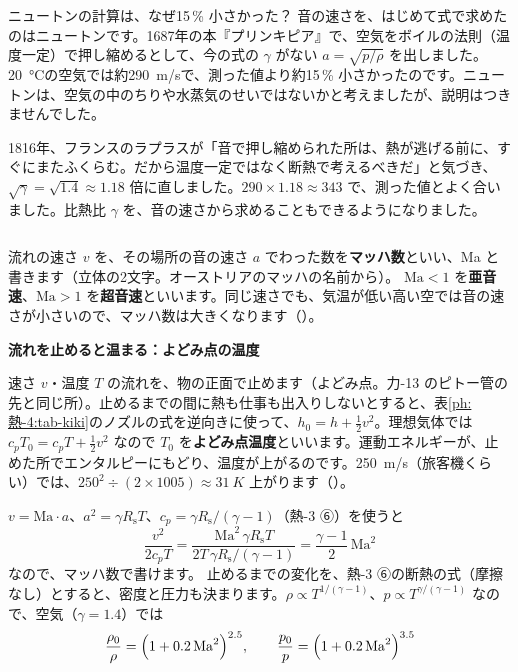 \begin{column}{ニュートンの計算は、なぜ15\,\% 小さかった？}
音の速さを、はじめて式で求めたのはニュートンです。1687年の本『プリンキピア』で、空気をボイルの法則（温度一定）で押し縮めるとして、今の式の $\gamma$ がない $a=\sqrt{p/\rho}$ を出しました。\qty{20}{\celsius}の空気では約\qty{290}{m/s}で、測った値より約15\,\% 小さかったのです。ニュートンは、空気の中のちりや水蒸気のせいではないかと考えましたが、説明はつきませんでした。

1816年、フランスのラプラスが「音で押し縮められた所は、熱が逃げる前に、すぐにまたふくらむ。だから温度一定ではなく断熱で考えるべきだ」と気づき、$\sqrt{\gamma}=\sqrt{1.4}\approx1.18$ 倍に直しました。$290\times1.18\approx343$ で、測った値とよく合いました。比熱比 $\gamma$ を、音の速さから求めることもできるようになりました。
\end{column}


\leavevmode\label{ph:熱-4:sec7}流れの速さ $v$ を、その場所の音の速さ $a$ でわった数を\textbf{マッハ数}といい、Ma と書きます（立体の2文字。オーストリアのマッハの名前から）。
$\mathrm{Ma}<1$ を\textbf{亜音速}、$\mathrm{Ma}>1$ を\textbf{超音速}といいます。同じ速さでも、気温が低い高い空では音の速さが小さいので、マッハ数は大きくなります（）。

\noindent\textbf{流れを止めると温まる：よどみ点の温度}\par\nobreak
速さ $v$・温度 $T$ の流れを、物の正面で止めます（よどみ点。力-13 のピトー管の先と同じ所）。止めるまでの間に熱も仕事も出入りしないとすると、表\ref{ph:熱-4:tab-kiki}のノズルの式を逆向きに使って、$h_0=h+\tfrac12v^2$。理想気体では $c_pT_0=c_pT+\tfrac12v^2$ なので
\label{ph:熱-4:yodomi}$T_0$ を\textbf{よどみ点温度}といいます。運動エネルギーが、止めた所でエンタルピーにもどり、温度が上がるのです。\qty{250}{m/s}（旅客機くらい）では、$250^2\div(2\times1005)\approx\qty{31}{K}$ 上がります（）。

$v=\mathrm{Ma}\cdot a$、$a^2=\gamma R_{\mathrm s}T$、$c_p=\gamma R_{\mathrm s}/(\gamma-1)$（熱-3 ⑥）を使うと
\[ \frac{v^2}{2c_pT}=\frac{\mathrm{Ma}^2\,\gamma R_{\mathrm s}T}{2T\,\gamma R_{\mathrm s}/(\gamma-1)}=\frac{\gamma-1}{2}\,\mathrm{Ma}^2 \]
なので、マッハ数で書けます。
止めるまでの変化を、熱-3 ⑥の断熱の式（摩擦なし）とすると、密度と圧力も決まります。$\rho\propto T^{1/(\gamma-1)}$、$p\propto T^{\gamma/(\gamma-1)}$ なので、空気（$\gamma=1.4$）では
\[ \frac{\rho_0}{\rho}=\Bigl(1+0.2\,\mathrm{Ma}^2\Bigr)^{2.5},\qquad \frac{p_0}{p}=\Bigl(1+0.2\,\mathrm{Ma}^2\Bigr)^{3.5} \]

